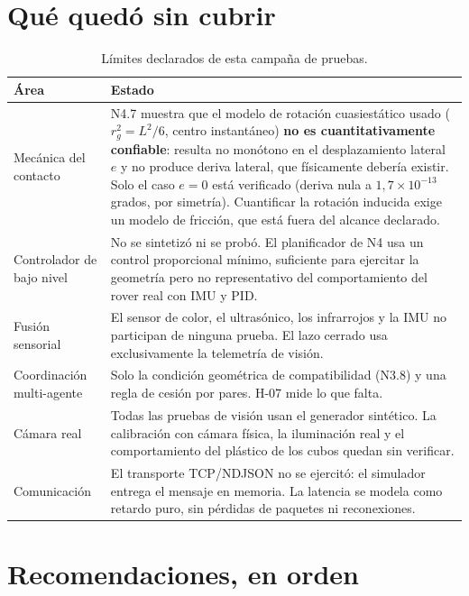 \documentclass[11pt,a4paper]{article}
\begin{document}
\section{Qué quedó sin cubrir}

\begin{table}[htbp]
\centering
\small
\caption{Límites declarados de esta campaña de pruebas.}
\begin{tabular}{p{4.6cm}p{9.6cm}}
\toprule
Área & Estado \\
\midrule
Mecánica del contacto & N4.7 muestra que el modelo de rotación cuasiestático usado
($r_g^2 = L^2/6$, centro instantáneo) \textbf{no es cuantitativamente confiable}:
resulta no monótono en el desplazamiento lateral $e$ y no produce deriva lateral, que
físicamente debería existir. Solo el caso $e=0$ está verificado (deriva nula a
$1{,}7\times10^{-13}$ grados, por simetría). Cuantificar la rotación inducida exige un
modelo de fricción, que está fuera del alcance declarado. \\
\addlinespace
Controlador de bajo nivel & No se sintetizó ni se probó. El planificador de N4 usa un
control proporcional mínimo, suficiente para ejercitar la geometría pero no
representativo del comportamiento del rover real con IMU y PID. \\
\addlinespace
Fusión sensorial & El sensor de color, el ultrasónico, los infrarrojos y la IMU no
participan de ninguna prueba. El lazo cerrado usa exclusivamente la telemetría de
visión. \\
\addlinespace
Coordinación multi-agente & Solo la condición geométrica de compatibilidad (N3.8) y una
regla de cesión por pares. H-07 mide lo que falta. \\
\addlinespace
Cámara real & Todas las pruebas de visión usan el generador sintético. La calibración
con cámara física, la iluminación real y el comportamiento del plástico de los cubos
quedan sin verificar. \\
\addlinespace
Comunicación & El transporte TCP/NDJSON no se ejercitó: el simulador entrega el mensaje
en memoria. La latencia se modela como retardo puro, sin pérdidas de paquetes ni
reconexiones. \\
\bottomrule
\end{tabular}
\end{table}

\section{Recomendaciones, en orden}
\end{document}

